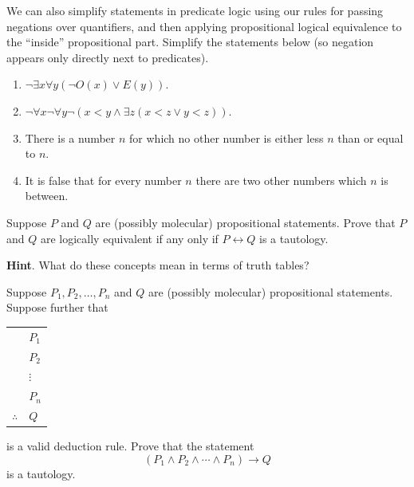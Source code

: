\documentclass[10pt,]{book}
\theoremstyle{plain}
\theoremstyle{definition}
\theoremstyle{definition}
\theoremstyle{definition}
\theoremstyle{definition}
\numberwithin{equation}{chapter}
\newcommand{\hrulethin}  {\noalign{\hrule height 0.04em}}
\def\iff{\leftrightarrow}
\def\imp{\rightarrow}
\newcommand{\lt}{<}
\begin{document}
\begin{divisionexercise}{14}\hypertarget{exercise-233}{}
\hypertarget{p-2002}{}%
We can also simplify statements in predicate logic using our rules for passing negations over quantifiers, and then applying propositional logical equivalence to the ``inside'' propositional part.  Simplify the statements below (so negation appears only directly next to predicates).%
\par
\hypertarget{p-2003}{}%
\leavevmode%
\begin{enumerate}[label=(\alph*)]
\item\hypertarget{li-663}{}\(\neg \exists x \forall y (\neg O(x) \vee E(y))\).%
\item\hypertarget{li-664}{}\(\neg \forall x \neg \forall y \neg(x \lt  y \wedge \exists z (x \lt  z \vee y \lt  z))\).%
\item\hypertarget{li-665}{}\hypertarget{p-2004}{}%
There is a number \(n\) for which no other number is either less \(n\) than or equal to \(n\).%
\item\hypertarget{li-666}{}\hypertarget{p-2005}{}%
It is false that for every number \(n\) there are two other numbers which \(n\) is between.%
\end{enumerate}
%
\end{divisionexercise}%
\begin{divisionexercise}{15}\hypertarget{exercise-234}{}
\hypertarget{p-2009}{}%
Suppose \(P\) and \(Q\) are (possibly molecular) propositional statements.  Prove that \(P\) and \(Q\) are logically equivalent if any only if \(P \iff Q\) is a tautology.%
\par\smallskip%
\noindent\textbf{Hint}.\hypertarget{hint-95}{}\quad%
\hypertarget{p-2010}{}%
What do these concepts mean in terms of truth tables?%
\end{divisionexercise}%
\begin{divisionexercise}{16}\hypertarget{exercise-235}{}
\hypertarget{p-2011}{}%
Suppose \(P_1, P_2, \ldots, P_n\) and \(Q\) are (possibly molecular) propositional statements.  Suppose further that%
\begin{sidebyside}{1}{0}{0}{0}
\begin{sbspanel}{1}
{\centering%
\begin{tabular}{ll}
&\(P_1\)\tabularnewline[0pt]
&\(P_2\)\tabularnewline[0pt]
&\(\vdots\)\tabularnewline[0pt]
&\(P_n\)\tabularnewline\hrulethin
\(\therefore\)&\(Q\)
\end{tabular}
\par}
\end{sbspanel}
\end{sidebyside}
\par
\hypertarget{p-2012}{}%
is a valid deduction rule.  Prove that the statement%
\begin{equation*}
(P_1 \wedge P_2 \wedge \cdots \wedge P_n) \imp Q
\end{equation*}
is a tautology.%
\end{divisionexercise}%
\typeout{************************************************}
\typeout{************************************************}
\end{document}
